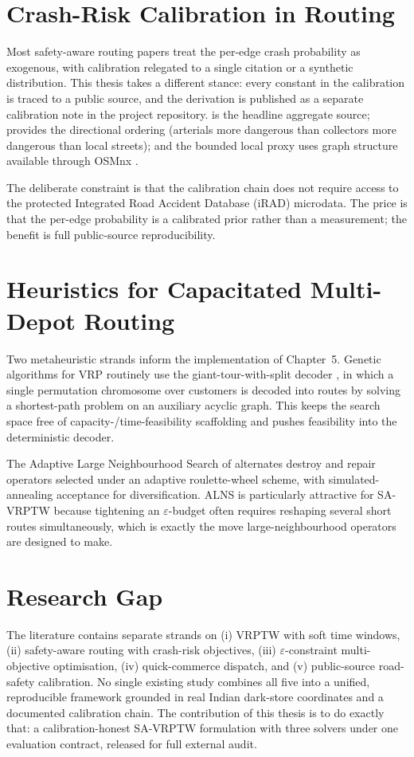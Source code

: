 \section{Crash-Risk Calibration in Routing}

Most safety-aware routing papers treat the per-edge crash probability
as exogenous, with calibration relegated to a single citation or a
synthetic distribution. This thesis takes a different stance: every
constant in the calibration is traced to a public source, and the
derivation is published as a separate calibration note in the
project repository. \citet{morth2022} is the headline aggregate
source; \citet{mohan2017} provides the directional ordering
(arterials more dangerous than collectors more dangerous than local
streets); and the bounded local proxy uses graph structure available
through OSMnx \citep{boeing2017osmnx}.

The deliberate constraint is that the calibration chain does not
require access to the protected Integrated Road Accident Database
(iRAD) microdata. The price is that the per-edge probability is a
calibrated prior rather than a measurement; the benefit is full
public-source reproducibility.

\section{Heuristics for Capacitated Multi-Depot Routing}

Two metaheuristic strands inform the implementation of Chapter~5.
Genetic algorithms for VRP \citep{holland1975} routinely use the
giant-tour-with-split decoder \citep{prins2004}, in which a single
permutation chromosome over customers is decoded into routes by
solving a shortest-path problem on an auxiliary acyclic graph. This
keeps the search space free of capacity-/time-feasibility scaffolding
and pushes feasibility into the deterministic decoder.

The Adaptive Large Neighbourhood Search of
\citet{ropke2006} alternates destroy and repair operators selected
under an adaptive roulette-wheel scheme, with simulated-annealing
acceptance for diversification. ALNS is particularly attractive for
SA-VRPTW because tightening an $\varepsilon$-budget often requires
reshaping several short routes simultaneously, which is exactly the
move large-neighbourhood operators are designed to make.

\section{Research Gap}

The literature contains separate strands on (i) VRPTW with soft time
windows, (ii) safety-aware routing with crash-risk objectives, (iii)
$\varepsilon$-constraint multi-objective optimisation, (iv)
quick-commerce dispatch, and (v) public-source road-safety
calibration. No single existing study combines all five into a
unified, reproducible framework grounded in real Indian dark-store
coordinates and a documented calibration chain. The contribution of
this thesis is to do exactly that: a calibration-honest SA-VRPTW
formulation with three solvers under one evaluation contract,
released for full external audit.
